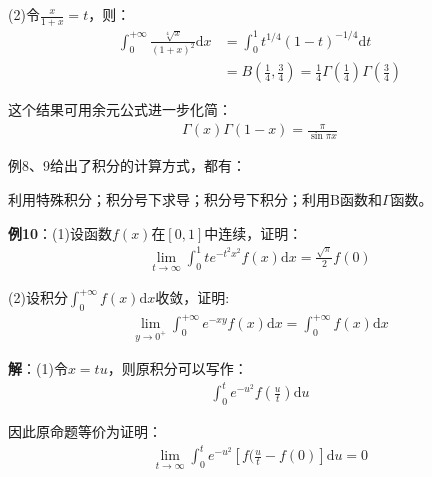 \documentclass{ctexart}
\let\oldtextbf\textbf
\renewcommand{\textbf}[1]{\textcolor{brown!50!red}{\oldtextbf{#1}}}
\begin{document}
(2)令$\frac{x}{1+x}=t$，则：
\begin{align*}
\int_0^{+\infty}\frac{\sqrt[4]{x}}{(1+x)^2}\mathrm{d}x&=\int_0^1 t^{1/4}(1-t)^{-1/4}\mathrm{d}t\\
&=B(\frac{1}{4},\frac{3}{4})=\frac{1}{4}\Gamma(\frac{1}{4})\Gamma(\frac{3}{4})   
\end{align*}
\begin{tcolorbox}[
    colback=bac2,     %
    colframe=fra2,   %
    coltitle=white,             %
    coltext=tex2,
    title=进一步化简——利用余元公式,
    fonttitle=\bfseries,        %
arc=3mm,                     %
breakable
]
这个结果可用余元公式进一步化简：
\begin{align*}
    \Gamma(x)\Gamma(1-x)=\frac{\pi}{\sin \pi x}
\end{align*}
\end{tcolorbox}
\begin{tcolorbox}[
    colback=bac1,     %
    colframe=fra1,   %
    coltitle=white!80,    
    coltext=tex1,%
    title=含参广义积分的计算方式,
    fonttitle=\bfseries,        %
arc=2mm,                     %
breakable
]
例8、9给出了积分的计算方式，都有：

利用特殊积分；积分号下求导；积分号下积分；利用B函数和$\Gamma$函数。
\end{tcolorbox}


\textbf{\color{brown!50!red}例10}：(1)设函数$f(x)$在$[0,1]$中连续，证明：
\begin{align*}
    \lim_{t\to\infty}\int_0^1 te^{-t^2x^2}f(x)\mathrm{d}x=\frac{\sqrt{\pi}}{2}f(0)
\end{align*}

(2)设积分$\int_0^{+\infty}f(x)\mathrm{d}x$收敛，证明:
\begin{align*}
    \lim_{y\to 0^+}\int_0^{+\infty}e^{-xy}f(x)\mathrm{d}x=\int_0^{+\infty}f(x)\mathrm{d}x
\end{align*}

\textbf{\color{brown!50!red}解}：(1)令$x=tu$，则原积分可以写作：
\begin{align*}
    \int_0^t e^{-u^2}f(\frac{u}{t})\mathrm{d}u
\end{align*}

因此原命题等价为证明：
\begin{align*}
   \lim_{t\to\infty} \int_0^t e^{-u^2}[f(\frac{u}{t}-f(0)]\mathrm{d}u=0
\end{align*}
\end{document}
